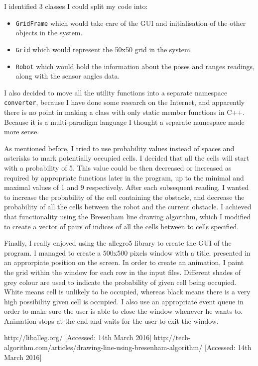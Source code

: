 \documentclass[a4paper, 12pt]{article}
\begin{document}
I identified 3 classes I could split my code into:
\begin{itemize}
	\item \texttt{GridFrame} which would take care of the GUI and initialisation
		of the other objects in the system.
	\item \texttt{Grid} which would represent the 50x50 grid in the system.
	\item \texttt{Robot} which would hold the information about the poses and 
		ranges readings, along with the sensor angles data.
\end{itemize}

I also decided to move all the utility functions into a separate namespace
\texttt{converter}, because I have done some research on the Internet, and 
apparently there is no point in making a class with only static member
functions in C++. Because it is a multi-paradigm language I thought a separate
namespace made more sense. 

As mentioned before, I tried to use probability values instead of spaces and 
asterisks to mark potentially occupied cells. I decided that all the cells will
start with a probability of 5. This value could be then decreased or increased 
as required by appropriate functions later in the program, up to the minimal
and maximal values of 1 and 9 respectively. After each subsequent reading, I
wanted to increase the probability of the cell containing the obstacle, and decrease
the probability of all the cells between the robot and the current obstacle. 
I achieved that functionality using the Bresenham line drawing algorithm\cite{2}, which
I modified to create a vector of pairs of indices of all the cells between
to cells specified.

Finally, I really enjoyed using the allegro5 library to create the GUI of the 
program. I managed to create a 500x500 pixels window with a title, presented
in an approrpiate position on the screen. In order to create an animation, I
paint the grid within the window for each row in the input files. Different 
shades of grey colour are used to indicate the probability of given cell being
occupied. White means cell is unlikely to be occupied, whereas black means there
is a very high possibility given cell is occupied. I also use an appropriate
event queue in order to make sure the user is able to close the window whenever
he wants to. Animation stops at the end and waits for the user to exit the
window.  

\newpage
{}
\begin{thebibliography}{2}
 http://liballeg.org/ [Accessed: 14th March 2016]
 http://tech-algorithm.com/articles/drawing-line-using-bresenham-algorithm/ [Accessed: 14th March 2016]

\end{thebibliography}
\end{document}
